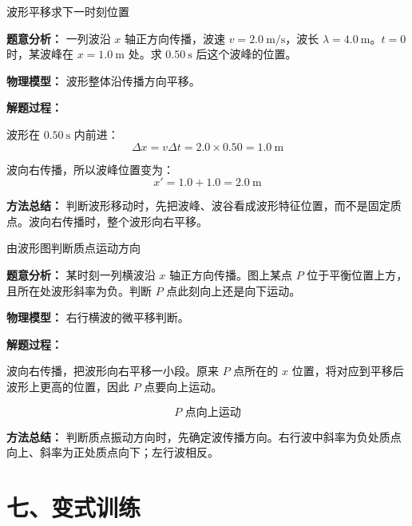 \begin{examplebox}{波形平移求下一时刻位置}

\textbf{题意分析：} 一列波沿 $x$ 轴正方向传播，波速 $v=2.0\ \mathrm{m/s}$，波长 $\lambda=4.0\ \mathrm{m}$。$t=0$ 时，某波峰在 $x=1.0\ \mathrm{m}$ 处。求 $0.50\ \mathrm{s}$ 后这个波峰的位置。

\begin{center}


\label{fig:wave-example-shift}
\end{center}

\textbf{物理模型：} 波形整体沿传播方向平移。

\textbf{解题过程：}

波形在 $0.50\ \mathrm{s}$ 内前进：
\[
\Delta x=v\Delta t=2.0\times 0.50=1.0\ \mathrm{m}
\]

波向右传播，所以波峰位置变为：
\[
x'=1.0+1.0=2.0\ \mathrm{m}
\]

\textbf{方法总结：} 判断波形移动时，先把波峰、波谷看成波形特征位置，而不是固定质点。波向右传播时，整个波形向右平移。

\end{examplebox}

\begin{examplebox}{由波形图判断质点运动方向}

\textbf{题意分析：} 某时刻一列横波沿 $x$ 轴正方向传播。图上某点 $P$ 位于平衡位置上方，且所在处波形斜率为负。判断 $P$ 点此刻向上还是向下运动。

\begin{center}


\label{fig:wave-example-direction}
\end{center}

\textbf{物理模型：} 右行横波的微平移判断。

\textbf{解题过程：}

波向右传播，把波形向右平移一小段。原来 $P$ 点所在的 $x$ 位置，将对应到平移后波形上更高的位置，因此 $P$ 点要向上运动。

\[
\boxed{P\text{ 点向上运动}}
\]

\textbf{方法总结：} 判断质点振动方向时，先确定波传播方向。右行波中斜率为负处质点向上、斜率为正处质点向下；左行波相反。

\end{examplebox}

\section*{七、变式训练}

